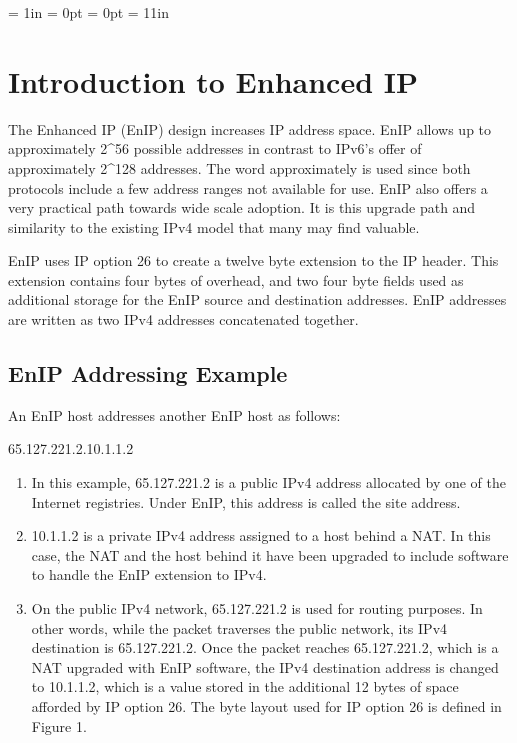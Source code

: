 %
\marginparwidth = 1in
\marginparpush = 0pt
\voffset = 0pt
\paperheight = 11in

\section{Introduction to Enhanced IP}
The Enhanced IP (EnIP) design increases IP address space.
EnIP allows up to approximately 2\textasciicircum 56 possible addresses 
in contrast to IPv6's offer of approximately 2\textasciicircum 128 addresses. 
The word approximately is used since both protocols include a few address 
ranges not available for use.  EnIP also offers a very practical path towards 
wide scale adoption.  It is this upgrade path and similarity to the existing IPv4
model that many may find valuable.

EnIP uses IP option 26 to create a twelve byte extension to the IP header.  This extension contains four bytes of overhead, 
and two four byte fields used as additional storage for the EnIP source and destination addresses.  
EnIP addresses are written as two IPv4 addresses concatenated together.

\subsection{EnIP Addressing Example}
An EnIP host addresses another EnIP host as follows:

\begin{center} 
65.127.221.2.10.1.1.2
\end{center}

\begin{enumerate}

\item In this example, 65.127.221.2 is a public IPv4 address allocated 
by one of the Internet registries.  Under EnIP, this address is called the site address.

\item 10.1.1.2 is a private IPv4 address assigned to a host behind a 
NAT.  In this case, the NAT and the host behind it have been upgraded to include
software to handle the EnIP extension to IPv4.

\item On the public IPv4 network, 65.127.221.2 is used for routing purposes.  In other words,
while the packet traverses the public network, its IPv4 destination is 65.127.221.2.  
Once the packet reaches 65.127.221.2, which is a NAT upgraded with EnIP software, the IPv4 
destination address is changed to 10.1.1.2, which is a value stored in the additional 12 bytes 
of space afforded by IP option 26.  The byte layout used for IP option 26 is defined in Figure 1.
\end{enumerate}


